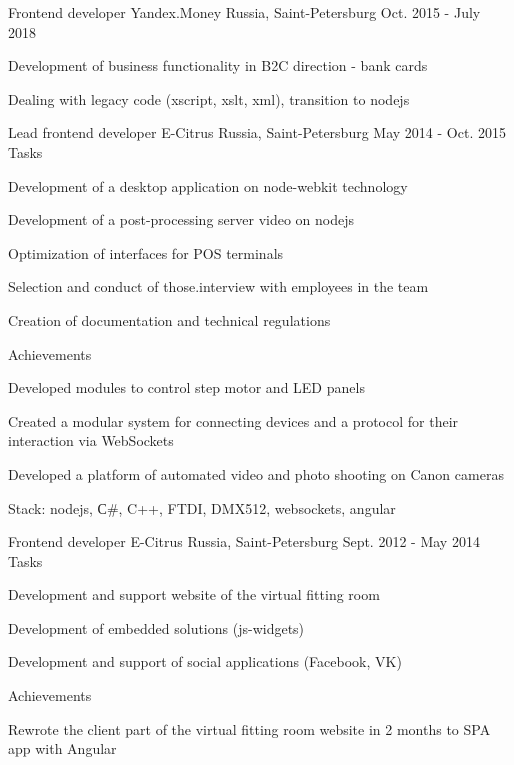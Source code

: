 \begin{cventries}
  \cventry
    {Frontend developer}
    {Yandex.Money}
    {Russia, Saint-Petersburg}
    {Oct. 2015 - July 2018}
    {
      \begin{cvitems}
        \item {Development of business functionality in B2C direction - bank cards}
        \item {Dealing with legacy code (xscript, xslt, xml), transition to nodejs}
      \end{cvitems}
    }

  \cvmultientry
    {Lead frontend developer}
    {E-Citrus}
    {Russia, Saint-Petersburg}
    {May 2014 - Oct. 2015}
    {Tasks}
    {
      \begin{cvitems}
        \item {Development of a desktop application on node-webkit technology}
        \item {Development of a post-processing server video on nodejs}
        \item {Optimization of interfaces for POS terminals}
        \item {Selection and conduct of those.interview with employees in the team}
        \item {Creation of documentation and technical regulations}
      \end{cvitems}
    }
    {Achievements}
    {
      \begin{cvitems}
        \item {Developed modules to control step motor and LED panels}
        \item {Created a modular system for connecting devices and a protocol for their interaction via WebSockets}
        \item {Developed a platform of automated video and photo shooting on Canon cameras}
      \end{cvitems}
    }

    \begin{cvskills}
      \cvskill
        {Stack:}
        {nodejs, С\#, C++, FTDI, DMX512, websockets, angular}
    \end{cvskills}

  \cvmultientry
    {Frontend developer}
    {E-Citrus}
    {Russia, Saint-Petersburg}
    {Sept. 2012 - May 2014}
    {Tasks}
    {
      \begin{cvitems}
        \item {Development and support website of the virtual fitting room}
        \item {Development of embedded solutions (js-widgets)}
        \item {Development and support of social applications (Facebook, VK)}
      \end{cvitems}
    }
    {Achievements}
    {
      \begin{cvitems}
        \item {Rewrote the client part of the virtual fitting room website in 2 months to SPA app with Angular}
      \end{cvitems}
    }


\end{cventries}
